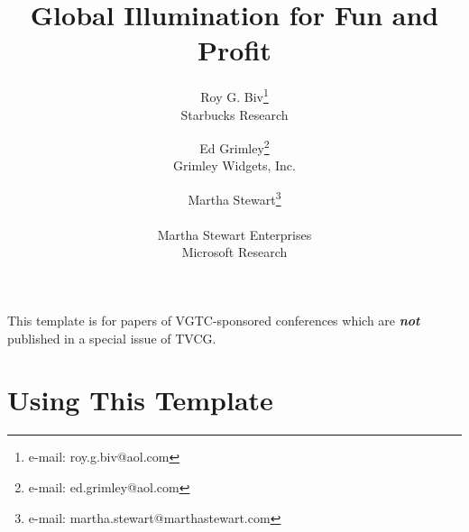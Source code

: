 \documentclass[review]{vgtc}                 %
\title{Global Illumination for Fun and Profit}
\author{Roy G. Biv\thanks{e-mail: roy.g.biv@aol.com}\\ %
        \scriptsize Starbucks Research %
\and Ed Grimley\thanks{e-mail: ed.grimley@aol.com}\\ %
     \scriptsize Grimley Widgets, Inc. %
\and Martha Stewart\thanks{e-mail: martha.stewart@marthastewart.com}\\ %
     \parbox{1.4in}{\scriptsize \centering Martha Stewart Enterprises \\ Microsoft Research}}
\begin{document}


\maketitle

This template is for papers of VGTC-sponsored conferences which are \emph{\textbf{not}} published in a special issue of TVCG.

\section{Using This Template}
\end{document}
